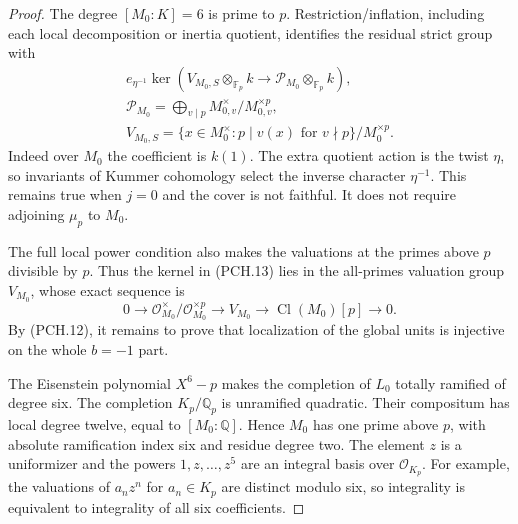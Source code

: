 \begin{proof}
The degree $[M_0:K]=6$ is prime to $p$.
Restriction/inflation, including each local decomposition or inertia
quotient, identifies the residual strict group with
\[
 \begin{gathered}
 e_{\eta^{-1}}\ker\left(V_{M_0,S}\otimes_{\mathbb F_p}k
                   \longrightarrow\mathcal P_{M_0}\otimes_{\mathbb F_p}k\right),\\
 \mathcal P_{M_0}=\bigoplus_{v\mid p}M_{0,v}^\times/M_{0,v}^{\times p},\\
 V_{M_0,S}=\{x\in M_0^\times:p\mid v(x)\text{ for }v\nmid p\}
                                                /M_0^{\times p}.
 \end{gathered}
 \tag{PCH.13}
\]
Indeed over $M_0$ the coefficient is $k(1)$.
The extra quotient action is the twist $\eta$, so invariants of
Kummer cohomology select the inverse character $\eta^{-1}$.
This remains true when $j=0$ and the cover is not faithful.
It does not require adjoining $\mu_p$ to $M_0$.

The full local power condition also makes the valuations at the
primes above $p$ divisible by $p$.
Thus the kernel in (PCH.13) lies in the all-primes valuation group
$V_{M_0}$, whose exact sequence is
\[
 0\longrightarrow\mathcal O_{M_0}^{\times}/\mathcal O_{M_0}^{\times p}
 \longrightarrow V_{M_0}
 \longrightarrow\operatorname{Cl}(M_0)[p]\longrightarrow0.
 \tag{PCH.14}
\]
By (PCH.12), it remains to prove that localization of the global
units is injective on the whole $b=-1$ part.

The Eisenstein polynomial $X^6-p$ makes the completion of $L_0$
totally ramified of degree six.
The completion $K_p/\mathbb Q_p$ is unramified quadratic.
Their compositum has local degree twelve, equal to $[M_0:\mathbb Q]$.
Hence $M_0$ has one prime above $p$, with absolute ramification
index six and residue degree two.
The element $z$ is a uniformizer and the powers $1,z,\ldots,z^5$
are an integral basis over $\mathcal O_{K_p}$.
For example, the valuations of $a_nz^n$ for $a_n\in K_p$
are distinct modulo six, so integrality is equivalent to
integrality of all six coefficients.


\end{proof}
